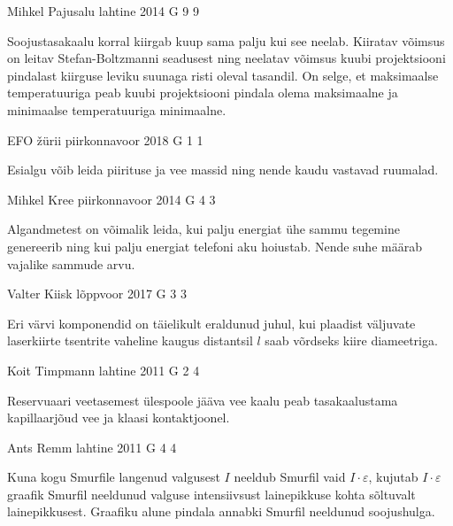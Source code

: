 \documentclass[11pt]{article}
\begin{document}
{%
{Mihkel Pajusalu} %
{lahtine} %
{2014} %
{G 9} %
{9} %
{

\ifHint
Soojustasakaalu korral kiirgab kuup sama palju kui see neelab. Kiiratav võimsus on leitav Stefan-Boltzmanni seadusest ning neelatav võimsus kuubi projektsiooni pindalast kiirguse leviku suunaga risti oleval tasandil. On selge, et maksimaalse temperatuuriga peab kuubi projektsiooni pindala olema maksimaalne ja minimaalse temperatuuriga minimaalne.
\fi
}

{EFO žürii} %
{piirkonnavoor} %
{2018} %
{G 1} %
{1} %
{

\ifHint
Esialgu võib leida piirituse ja vee massid ning nende kaudu vastavad ruumalad.
\fi
}

{Mihkel Kree} %
{piirkonnavoor} %
{2014} %
{G 4} %
{3} %
{

\ifHint
Algandmetest on võimalik leida, kui palju energiat ühe sammu tegemine genereerib ning kui palju energiat telefoni aku hoiustab. Nende suhe määrab vajalike sammude arvu.
\fi
}

{Valter Kiisk} %
{lõppvoor} %
{2017} %
{G 3} %
{3} %
{

\ifHint
Eri värvi komponendid on täielikult eraldunud juhul, kui plaadist väljuvate laserkiirte tsentrite vaheline kaugus distantsil $l$ saab võrdseks kiire diameetriga.
\fi
}

{Koit Timpmann} %
{lahtine} %
{2011} %
{G 2} %
{4} %
{

\ifHint
Reservuaari veetasemest ülespoole jääva vee kaalu peab tasakaalustama kapillaarjõud vee ja klaasi kontaktjoonel.
\fi
}

{Ants Remm} %
{lahtine} %
{2011} %
{G 4} %
{4} %
{

\ifHint
Kuna kogu Smurfile langenud valgusest $I$ neeldub Smurfil vaid $ I \cdot\varepsilon $, kujutab $ I \cdot \varepsilon $ graafik Smurfil neeldunud valguse intensiivsust lainepikkuse kohta sõltuvalt lainepikkusest. Graafiku alune pindala annabki Smurfil neeldunud soojushulga. 
\fi
}

}
\end{document}
